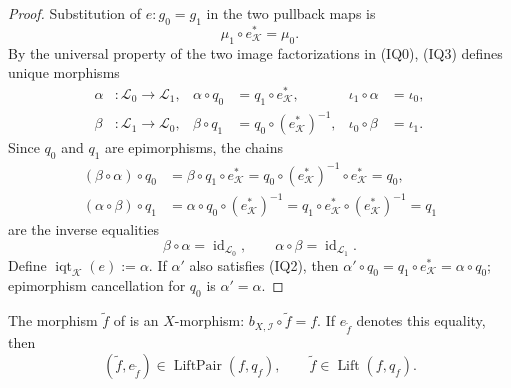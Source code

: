 \begin{proof}
  Substitution of $e\colon g_0=g_1$ in the two pullback maps is
  \[
    \mu_1\circ e_{\mathcal K}^*=\mu_0.                        \tag{IQ3}
  \]
  By the universal property of the two image factorizations in (IQ0), (IQ3)
  defines unique morphisms
  \[
  \begin{aligned}
    \alpha&\colon\mathcal L_0\to\mathcal L_1,
      &\alpha\circ q_0&=q_1\circ e_{\mathcal K}^*,
      &\iota_1\circ\alpha&=\iota_0,\\
    \beta&\colon\mathcal L_1\to\mathcal L_0,
      &\beta\circ q_1&=q_0\circ(e_{\mathcal K}^*)^{-1},
      &\iota_0\circ\beta&=\iota_1.
  \end{aligned}                                                  \tag{IQ4}
  \]
  Since $q_0$ and $q_1$ are epimorphisms, the chains
  \[
  \begin{aligned}
    (\beta\circ\alpha)\circ q_0
      &=\beta\circ q_1\circ e_{\mathcal K}^*
       =q_0\circ(e_{\mathcal K}^*)^{-1}\circ e_{\mathcal K}^*=q_0,\\
    (\alpha\circ\beta)\circ q_1
      &=\alpha\circ q_0\circ(e_{\mathcal K}^*)^{-1}
       =q_1\circ e_{\mathcal K}^*\circ(e_{\mathcal K}^*)^{-1}=q_1
  \end{aligned}
  \]
  are the inverse equalities
  \[
    \beta\circ\alpha=\operatorname{id}_{\mathcal L_0},
    \qquad
    \alpha\circ\beta=\operatorname{id}_{\mathcal L_1}.
  \]
  Define $\operatorname{iqt}_{\mathcal K}(e):=\alpha$.  If $\alpha'$ also
  satisfies (IQ2), then
  $\alpha'\circ q_0=q_1\circ e_{\mathcal K}^*=\alpha\circ q_0$; epimorphism
  cancellation for $q_0$ is $\alpha'=\alpha$.
\end{proof}

\begin{lemma}
  \label{lemma:nagata-blowup-universal-exists}
  \lean{}

  The morphism $\widetilde f$ of
   is an $X$-morphism:
  $b_{X,\mathcal I}\circ\widetilde f=f$.  If
  $e_{\widetilde f}$ denotes this equality, then
  \[
    (\widetilde f,e_{\widetilde f})
      \in\operatorname{LiftPair}(f,q_f),
    \qquad
    \widetilde f\in\operatorname{Lift}(f,q_f).
  \]
\end{lemma}

